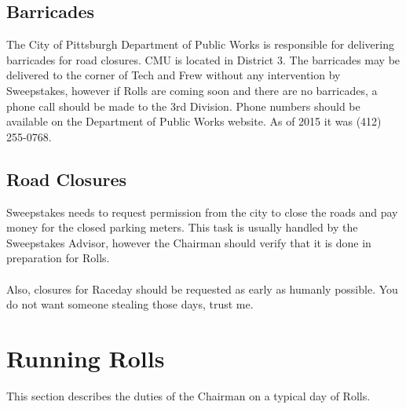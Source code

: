 \subsection{Barricades}
The City of Pittsburgh Department of Public Works is responsible for delivering
barricades for road closures. CMU is located in District 3. The barricades may
be delivered to the corner of Tech and Frew without any intervention by
Sweepstakes, however if Rolls are coming soon and there are no barricades,
a phone call should be made to the 3rd Division. Phone numbers should be
available on the Department of Public Works website. As of 2015 it was
(412) 255-0768.

\subsection{Road Closures}
Sweepstakes needs to request permission from the city to close the roads and
pay money for the closed parking meters. This task is usually handled by the
Sweepstakes Advisor, however the Chairman should verify that it is done in
preparation for Rolls.
\\\\
Also, closures for Raceday should be requested as early as humanly possible.
You do not want someone stealing those days, trust me.


\section{Running Rolls}
\label{sec:ChairRunningRolls}
This section describes the duties of the Chairman on a typical day of Rolls.

